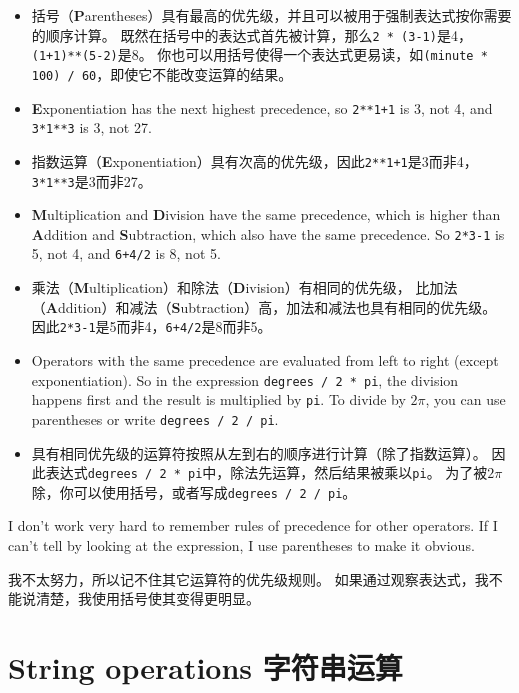 \documentclass[10pt]{book}
\begin{document}
\begin{CJK}{UTF8}{gbsn}
\begin{itemize}
\item 括号（{\bf P}arentheses）具有最高的优先级，并且可以被用于强制表达式按你需要的顺序计算。
既然在括号中的表达式首先被计算，那么{\tt 2 * (3-1)}是4，{\tt (1+1)**(5-2)}是8。
你也可以用括号使得一个表达式更易读，如{\tt (minute * 100) / 60}，即使它不能改变运算的结果。

\item {\bf E}xponentiation has the next highest precedence, so
{\tt 2**1+1} is 3, not 4, and {\tt 3*1**3} is 3, not 27.

\item 指数运算（{\bf E}xponentiation）具有次高的优先级，因此{\tt 2**1+1}是3而非4，
{\tt 3*1**3}是3而非27。

\item {\bf M}ultiplication and {\bf D}ivision have the same precedence,
which is higher than {\bf A}ddition and {\bf S}ubtraction, which also
have the same precedence.  So {\tt 2*3-1} is 5, not 4, and
{\tt 6+4/2} is 8, not 5.

\item 乘法（{\bf M}ultiplication）和除法（{\bf D}ivision）有相同的优先级，
比加法（{\bf A}ddition）和减法（{\bf S}ubtraction）高，加法和减法也具有相同的优先级。
因此{\tt 2*3-1}是5而非4，{\tt 6+4/2}是8而非5。

\item Operators with the same precedence are evaluated from left to
  right (except exponentiation).  So in the expression {\tt degrees /
    2 * pi}, the division happens first and the result is multiplied
  by {\tt pi}.  To divide by $2 \pi$, you can use parentheses or write
  {\tt degrees / 2 / pi}.
  
\item 具有相同优先级的运算符按照从左到右的顺序进行计算（除了指数运算）。
因此表达式{\tt degrees / 2 * pi}中，除法先运算，然后结果被乘以{\tt pi}。
为了被$2 \pi$除，你可以使用括号，或者写成{\tt degrees / 2 / pi}。

\end{itemize}

I don't work very hard to remember rules of precedence for other
operators.  If I can't tell by looking at the expression, I use
parentheses to make it obvious.

我不太努力，所以记不住其它运算符的优先级规则。
如果通过观察表达式，我不能说清楚，我使用括号使其变得更明显。

\section{String operations 字符串运算}


\end{CJK}
\end{document}
